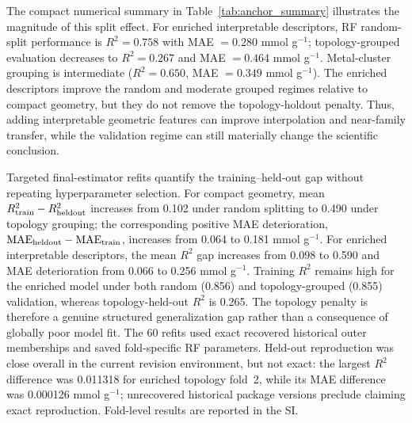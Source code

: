 \documentclass[11pt,a4paper]{article}
\begin{document}
The compact numerical summary in Table~\ref{tab:anchor_summary} illustrates the magnitude of this split effect. For enriched interpretable descriptors, RF random-split performance is $R^2 = 0.758$ with MAE $=0.280$ mmol g$^{-1}$; topology-grouped evaluation decreases to $R^2 = 0.267$ and MAE $=0.464$ mmol g$^{-1}$. Metal-cluster grouping is intermediate ($R^2 = 0.650$, MAE $=0.349$ mmol g$^{-1}$). The enriched descriptors improve the random and moderate grouped regimes relative to compact geometry, but they do not remove the topology-holdout penalty. Thus, adding interpretable geometric features can improve interpolation and near-family transfer, while the validation regime can still materially change the scientific conclusion.

Targeted final-estimator refits quantify the training--held-out gap without repeating hyperparameter selection. For compact geometry, mean $R^2_{\rm train}-R^2_{\rm heldout}$ increases from 0.102 under random splitting to 0.490 under topology grouping; the corresponding positive MAE deterioration, $\mathrm{MAE}_{\rm heldout}-\mathrm{MAE}_{\rm train}$, increases from 0.064 to 0.181 mmol g$^{-1}$. For enriched interpretable descriptors, the mean $R^2$ gap increases from 0.098 to 0.590 and MAE deterioration from 0.066 to 0.256 mmol g$^{-1}$. Training $R^2$ remains high for the enriched model under both random (0.856) and topology-grouped (0.855) validation, whereas topology-held-out $R^2$ is 0.265. The topology penalty is therefore a genuine structured generalization gap rather than a consequence of globally poor model fit.  The 60 refits used exact recovered historical outer memberships and saved fold-specific RF parameters. Held-out reproduction was close overall in the current revision environment, but not exact: the largest $R^2$ difference was 0.011318 for enriched topology fold~2, while its MAE difference was 0.000126 mmol g$^{-1}$; unrecovered historical package versions preclude claiming exact reproduction. Fold-level results are reported in the SI.
\end{document}
